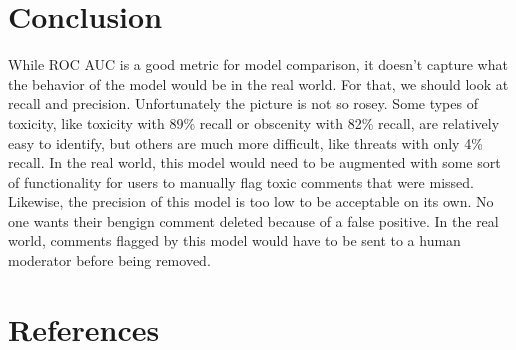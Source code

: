 \documentclass[12pt]{article}
\begin{document}
\section*{Conclusion}
\label{sec:orgfe1c477}
While ROC AUC is a good metric for model comparison, it doesn't capture what the behavior of the model would be in the real world. For that, we should look at recall and precision. Unfortunately the picture is not so rosey. Some types of toxicity, like toxicity with 89\% recall or obscenity with 82\% recall, are relatively easy to identify, but others are much more difficult, like threats with only 4\% recall. In the real world, this model would need to be augmented with some sort of functionality for users to manually flag toxic comments that were missed. Likewise, the precision of this model is too low to be acceptable on its own. No one wants their bengign comment deleted because of a false positive. In the real world, comments flagged by this model would have to be sent to a human moderator before being removed.
\section*{References}
\label{sec:org0d7e2c6}
\printbibliography[heading=none]
\end{document}
